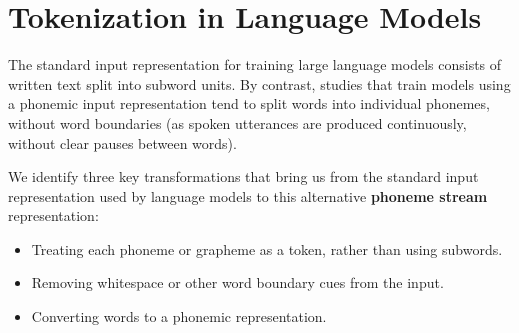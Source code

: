 
\section{Tokenization in Language Models}\label{sec:12-tokenization}



The standard input representation for training large language models consists of written text split into subword units. By contrast, studies that train models using a phonemic input representation tend to split words into individual phonemes, without word boundaries (as spoken utterances are produced continuously, without clear pauses between words).

We identify three key transformations that bring us from the standard input representation used by language models to this alternative \textbf{phoneme stream} representation:


\begin{itemize}
\setlength\itemsep{0.1em}
    \item {} Treating each phoneme or grapheme as a token, rather than using subwords.
    \item {} Removing whitespace or other word boundary cues from the input.
    \item {} Converting words to a phonemic representation. 
\end{itemize}


